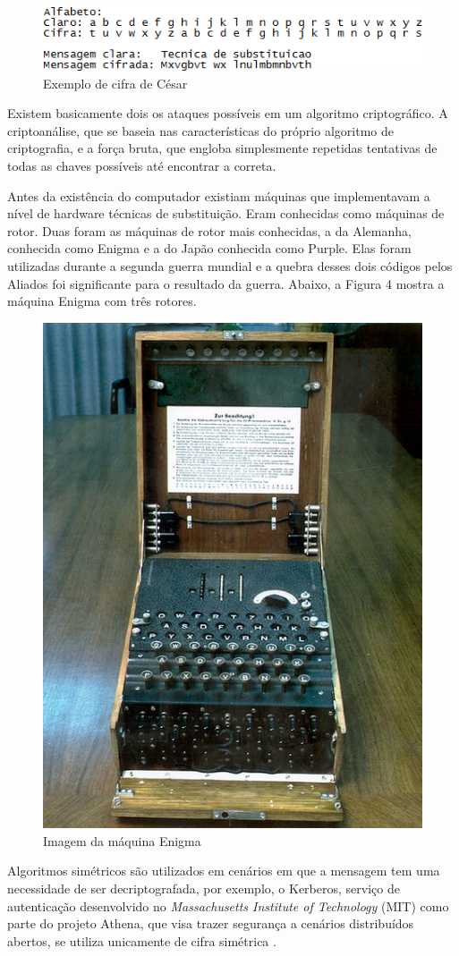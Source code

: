 \begin{figure}[H]
    \centering
    \caption{Exemplo de cifra de César}
    \includegraphics{Figuras/CifraDeCesar.png}
\end{figure}

Existem basicamente dois os ataques possíveis em um algoritmo criptográfico. A criptoanálise, que se baseia nas características do próprio algoritmo de criptografia, e a força bruta, que engloba simplesmente repetidas tentativas de todas as chaves possíveis até encontrar a correta.

Antes da existência do computador existiam máquinas que implementavam a nível de hardware técnicas de substituição. Eram conhecidas como máquinas de rotor. Duas foram as máquinas de rotor mais conhecidas, a da Alemanha, conhecida como Enigma e a do Japão conhecida como Purple. Elas foram utilizadas durante a segunda guerra mundial e a quebra desses dois códigos pelos Aliados foi significante para o resultado da guerra. Abaixo, a Figura 4 mostra a máquina Enigma com três rotores.

\begin{figure}[H]
    \centering
    \caption{Imagem da máquina Enigma}
    \includegraphics[width=.35\linewidth]{Figuras/MaqEnigma.jpg}
\end{figure}

Algoritmos simétricos são utilizados em cenários em que a mensagem tem uma necessidade de ser decriptografada, por exemplo, o Kerberos, serviço de autenticação desenvolvido no \textit{Massachusetts Institute of Technology} (MIT) como parte do projeto Athena, que visa trazer segurança a cenários distribuídos abertos, se utiliza unicamente de cifra simétrica \cite{stallings14}.

